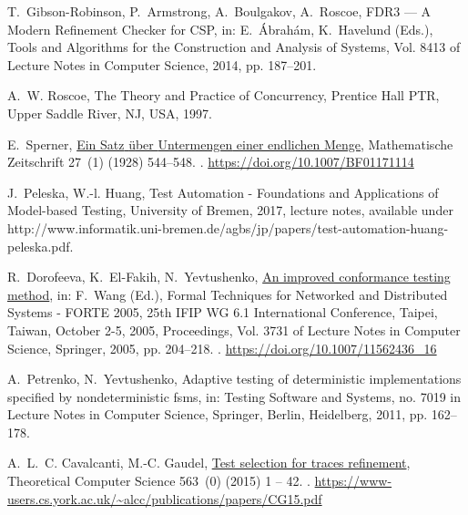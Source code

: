 \documentclass[3p,times]{elsarticle}
\begin{document}
\begin{thebibliography}{10}
T.~Gibson-Robinson, P.~Armstrong, A.~Boulgakov, A.~Roscoe, {FDR3 --- A Modern
  Refinement Checker for CSP}, in: E.~Ábrahám, K.~Havelund (Eds.), Tools and
  Algorithms for the Construction and Analysis of Systems, Vol. 8413 of Lecture
  Notes in Computer Science, 2014, pp. 187--201.

A.~W. Roscoe, The Theory and Practice of Concurrency, Prentice Hall PTR, Upper
  Saddle River, NJ, USA, 1997.

E.~Sperner, \href{https://doi.org/10.1007/BF01171114}{Ein {Satz} {\"u}ber
  {Untermengen} einer endlichen {Menge}}, Mathematische Zeitschrift 27~(1)
  (1928) 544--548.
\newblock \href {http://dx.doi.org/10.1007/BF01171114}
  {}.
\newline\urlprefix\url{https://doi.org/10.1007/BF01171114}

J.~Peleska, W.-l. Huang, Test Automation - Foundations and Applications of
  Model-based Testing, University of Bremen, 2017, lecture notes, available
  under
  http://www.informatik.uni-bremen.de/agbs/jp/papers/test-automation-huang-peleska.pdf.

R.~Dorofeeva, K.~El{-}Fakih, N.~Yevtushenko,
  \href{https://doi.org/10.1007/11562436_16}{An improved conformance testing
  method}, in: F.~Wang (Ed.), Formal Techniques for Networked and Distributed
  Systems - {FORTE} 2005, 25th {IFIP} {WG} 6.1 International Conference,
  Taipei, Taiwan, October 2-5, 2005, Proceedings, Vol. 3731 of Lecture Notes in
  Computer Science, Springer, 2005, pp. 204--218.
\newblock \href {http://dx.doi.org/10.1007/11562436_16}
  {}.
\newline\urlprefix\url{https://doi.org/10.1007/11562436_16}

A.~Petrenko, N.~Yevtushenko, Adaptive testing of deterministic implementations
  specified by nondeterministic fsms, in: Testing Software and Systems, no.
  7019 in Lecture Notes in Computer Science, Springer, Berlin, Heidelberg,
  2011, pp. 162--178.

A.~L.~C. Cavalcanti, M.-C. Gaudel,
  \href{https://www-users.cs.york.ac.uk/~alcc/publications/papers/CG15.pdf}{Test
  selection for traces refinement}, Theoretical Computer Science 563~(0) (2015)
  1 -- 42.
\newblock \href {http://dx.doi.org/10.1016/j.tcs.2014.08.012}
  {}.
\newline\urlprefix\url{https://www-users.cs.york.ac.uk/~alcc/publications/papers/CG15.pdf}


\end{thebibliography}
\end{document}
